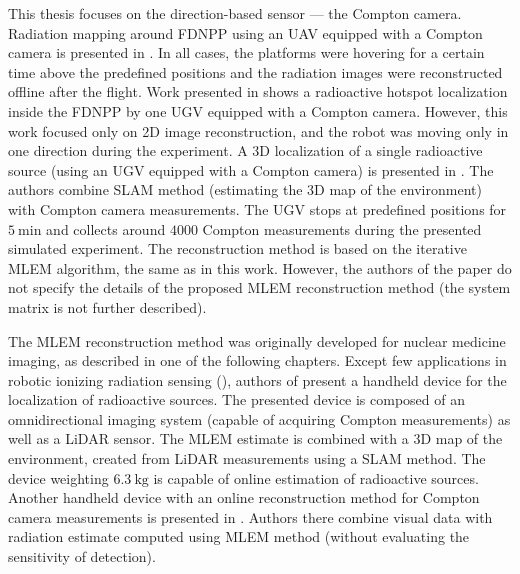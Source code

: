 This thesis focuses on the direction-based sensor --- the Compton camera.
Radiation mapping around \ac{FDNPP} using an \ac{UAV} equipped with a Compton camera is presented in \cite{Jiang2015, Mochizuki_2017, sato_drone_compton_camera_2018}.
In all cases, the platforms were hovering for a certain time above the predefined positions and the radiation images were reconstructed offline after the flight.
Work presented in \cite{fuku_compton} shows a radioactive hotspot localization inside the \ac{FDNPP} by one \ac{UGV} equipped with a Compton camera.
However, this work focused only on 2D image reconstruction, and the robot was moving only in one direction during the experiment.
A 3D localization of a single radioactive source (using an \ac{UGV} equipped with a Compton camera) is presented in \cite{3D_compton_mobile_robot_2017}.
The authors combine \ac{SLAM} method (estimating the 3D map of the environment) with Compton camera measurements. %
The \ac{UGV} stops at predefined positions for $\SI{5}{\minute}$ and collects around $4000$ Compton measurements during the presented simulated experiment.
The reconstruction method is based on the iterative \ac{MLEM} algorithm, the same as in this work.
However, the authors of the paper do not specify the details of the proposed \ac{MLEM} reconstruction method (the system matrix is not further described).

The \ac{MLEM} reconstruction method was originally developed for nuclear medicine imaging, as described in one of the following chapters.
Except few applications in robotic ionizing radiation sensing (\cite{fuku_compton, 3D_compton_mobile_robot_2017}), authors of \cite{handheld_mlem_reconstruction}
present a handheld device for the localization of radioactive sources. 
The presented device is composed of an omnidirectional imaging system (capable of acquiring Compton measurements) as well as a \ac{LiDAR} sensor.
The \ac{MLEM} estimate is combined with a 3D map of the environment, created from \ac{LiDAR} measurements using a \ac{SLAM} method.
The device weighting $\SI{6.3}{\kilogram}$ is capable of online estimation of radioactive sources.
Another handheld device with an online reconstruction method for Compton camera measurements is presented in \cite{handheld_visual}.
Authors there combine visual data with radiation estimate computed using \ac{MLEM} method (without evaluating the sensitivity of detection).

